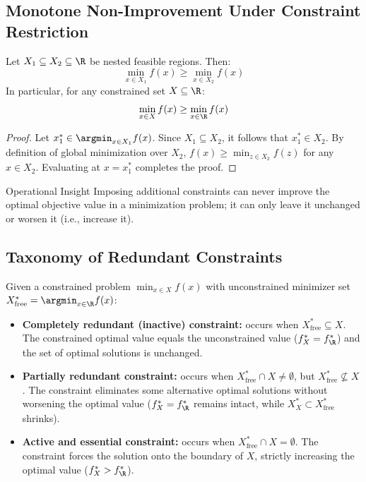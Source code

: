 \subsection{Monotone Non-Improvement Under Constraint Restriction}
\begin{theorem}
Let $X_1 \subseteq X_2 \subseteq \R$ be nested feasible regions. Then:
\begin{equation}
\min_{x \in X_1} f(x) \ge \min_{x \in X_2} f(x)
\end{equation}
In particular, for any constrained set $X \subseteq \R$:
\begin{equation}
\min_{x \in X} f(x) \ge \min_{x \in \R} f(x)
\end{equation}
\end{theorem}
\begin{proof}
Let $x_1^* \in \argmin_{x \in X_1} f(x)$. Since $X_1 \subseteq X_2$, it follows that $x_1^* \in X_2$. By definition of global minimization over $X_2$, $f(x) \ge \min_{z \in X_2} f(z)$ for any $x \in X_2$. Evaluating at $x = x_1^*$ completes the proof.
\end{proof}

\begin{noteblock}{Operational Insight}
Imposing additional constraints can never improve the optimal objective value in a minimization problem; it can only leave it unchanged or worsen it (i.e., increase it).
\end{noteblock}

\subsection{Taxonomy of Redundant Constraints}
Given a constrained problem $\min_{x \in X} f(x)$ with unconstrained minimizer set $X^*_{\text{free}} = \argmin_{x \in \R} f(x)$:
\begin{itemize}
    \item \textbf{Completely redundant (inactive) constraint:} occurs when $X^*_{\text{free}} \subseteq X$. The constrained optimal value equals the unconstrained value ($f^*_X = f^*_{\R}$) and the set of optimal solutions is unchanged.
    \item \textbf{Partially redundant constraint:} occurs when $X^*_{\text{free}} \cap X \neq \emptyset$, but $X^*_{\text{free}} \not\subseteq X$. The constraint eliminates some alternative optimal solutions without worsening the optimal value ($f^*_X = f^*_{\R}$ remains intact, while $X^*_X \subset X^*_{\text{free}}$ shrinks).
    \item \textbf{Active and essential constraint:} occurs when $X^*_{\text{free}} \cap X = \emptyset$. The constraint forces the solution onto the boundary of $X$, strictly increasing the optimal value ($f^*_X > f^*_{\R}$).
\end{itemize}

